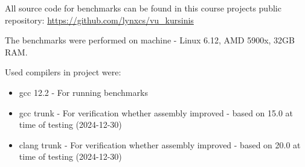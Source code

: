 \documentclass[
    english, %
]{VUMIFPSkursinis}
\begin{document}

All source code for benchmarks can be found in this course projects public repository: \url{https://github.com/lynxcs/vu_kursinis}

The benchmarks were performed on machine - Linux 6.12, AMD 5900x, 32GB RAM.

Used compilers in project were:
\begin{itemize}
    \item gcc 12.2 - For running benchmarks
    \item gcc trunk - For verification whether assembly improved - based on 15.0 at time of testing (2024-12-30)
    \item clang trunk - For verification whether assembly improved - based on 20.0 at time of testing (2024-12-30)
\end{itemize}






\end{document}
